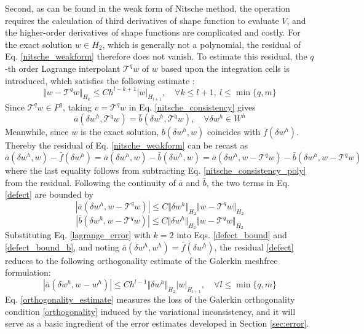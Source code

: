 Second, as can be found in the weak form of Nitsche method, the operation requires the calculation of third derivatives of shape function to evaluate $V$, and the higher-order derivatives of shape functions are complicated and costly.
For the exact solution $w\in H_2$, which is generally not a polynomial, the residual of Eq. \eqref{nitsche_weakform} therefore does not vanish.
To estimate this residual, the $q$-th order Lagrange interpolant $\mathcal T^{q}w$ of $w$ based upon the integration cells is introduced, which satisfies the following estimate \cite{ref50}:
\begin{equation}\label{lagrange_error}
	\Vert w-\mathcal T^{q}w \Vert_{H_{k}}\le C h^{l-k+1}\vert w \vert_{H_{l+1}},\quad \forall k\le l+1,\ l\le\min\{q,m\}
\end{equation}
Since $\mathcal T^{q}w\in P^q$, taking $v=\mathcal T^{q}w$ in Eq. \eqref{nitsche_consistency} gives
\begin{equation}\label{nitsche_consistency_poly}
	\bar a(\delta w^h, \mathcal T^q w) = \bar b(\delta w^h, \mathcal T^q w), \quad \forall \delta w^h \in W^h
\end{equation}
Meanwhile, since $w$ is the exact solution, $\bar b(\delta w^h, w)$ coincides with $\bar f(\delta w^h)$.
Thereby the residual of Eq. \eqref{nitsche_weakform} can be recast as
\begin{equation}\label{defect}
	\bar a(\delta w^h, w) - \bar f(\delta w^h)
	= \bar a(\delta w^h, w) - \bar b(\delta w^h, w) 
	= \bar a(\delta w^h, w - \mathcal T^q w) - \bar b(\delta w^h, w - \mathcal T^q w)
\end{equation}
where the last equality follows from subtracting Eq. \eqref{nitsche_consistency_poly} from the residual.
Following the continuity of $\bar a$ and $\bar b$, the two terms in Eq. \eqref{defect} are bounded by
\begin{equation}\label{defect_bound}
	\left| \bar a(\delta w^h, w - \mathcal T^q w) \right| \le C \Vert \delta w^h \Vert_{H_2} \Vert w - \mathcal T^q w \Vert_{H_2}
\end{equation}
\begin{equation}\label{defect_bound_b}
	\left| \bar b(\delta w^h, w - \mathcal T^q w) \right| \le C \Vert \delta w^h \Vert_{H_2} \Vert w - \mathcal T^q w \Vert_{H_2}
\end{equation}
Substituting Eq. \eqref{lagrange_error} with $k=2$ into Eqs. \eqref{defect_bound} and \eqref{defect_bound_b}, and noting $\bar a(\delta w^h, w^h)=\bar f(\delta w^h)$, the residual \eqref{defect} reduces to the following orthogonality estimate of the Galerkin meshfree formulation:
\begin{equation}\label{orthogonality_estimate}
	\left| \bar a(\delta w^h, w - w^h) \right| \le C h^{l-1} \Vert \delta w^h \Vert_{H_2} \vert w \vert_{H_{l+1}}, \quad \forall l \le \min\{q,m\}
\end{equation}
Eq. \eqref{orthogonality_estimate} measures the loss of the Galerkin orthogonality condition \eqref{orthogonality} induced by the variational inconsistency, and it will serve as a basic ingredient of the error estimates developed in Section \ref{sec:error}.
